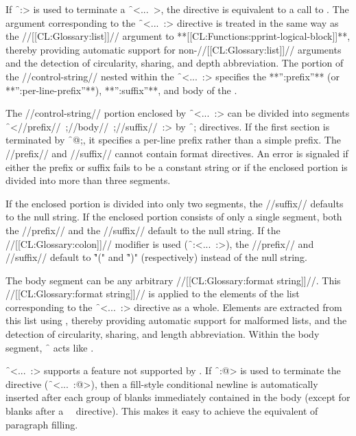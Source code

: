 If \f{~:>} is used to terminate a \f{~<...~>},
the directive is equivalent to a call to .
The argument corresponding to the \f{~<...~:>} directive is treated in
the same way as the //[[CL:Glossary:list]]// argument to **[[CL:Functions:pprint-logical-block]]**,
thereby providing automatic support for non-//[[CL:Glossary:list]]// arguments and
the detection of circularity, sharing, and depth abbreviation.  
The portion of the //control-string// nested within the \f{~<...~:>}
specifies the **'':prefix''** (or **'':per-line-prefix''**), **'':suffix''**,
and body of the .
 
The //control-string// portion enclosed by \f{~<...~:>} can be divided
into segments \f{~<//prefix//~;//body//~;//suffix//~:>}
by \f{~;} directives.  If the first section is terminated by \f{~@;}, 
it specifies a per-line prefix rather than a simple prefix.  
The //prefix// and //suffix// cannot contain format directives.  
An error is signaled if either the prefix or suffix fails to be a
constant string or if the enclosed portion is divided into more than three segments.
 
If the enclosed portion is divided into only two segments, the //suffix//
defaults to the null string.  If the enclosed portion consists of only
a single segment, both the //prefix// and the //suffix// default to 
the null string.  If the //[[CL:Glossary:colon]]// modifier is used (\ie \f{~:<...~:>}),
the //prefix// and //suffix// default to \f{"("} and \f{")"}
(respectively) instead of the null string.
 
The body segment can be any arbitrary //[[CL:Glossary:format string]]//.
This //[[CL:Glossary:format string]]// is applied to the elements of the list
corresponding to the \f{~<...~:>} directive as a whole.
Elements are extracted from this list using ,
thereby providing automatic support for malformed lists, and the detection
of circularity, sharing, and length abbreviation.
Within the body segment, \f{~{\hat}} acts like .
 
\f{~<...~:>} supports a feature not supported by .
If \f{~:@>} is used to terminate the directive (\ie \f{~<...~:@>}), 
then a fill-style conditional newline is automatically inserted after each
group of blanks immediately contained in the body (except for blanks
after a ~\NewlineChar\ directive).  This makes it easy to achieve the
equivalent of paragraph filling.
 
